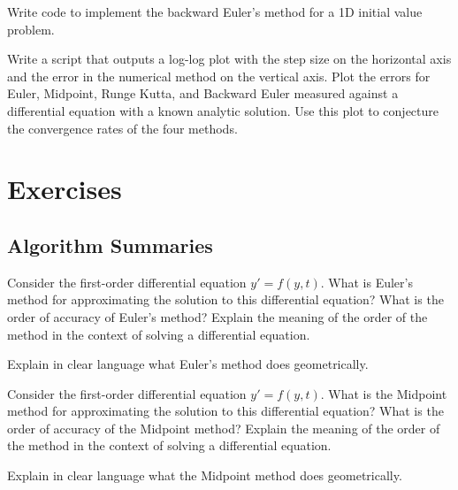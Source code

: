 \begin{problem}
    Write \ProgLang code to implement the backward Euler's method for a 1D initial value
    problem. \\
    \ifnum{}
    \else
    \fi
\end{problem}


\begin{problem}
    Write a \ProgLang script that outputs a log-log plot with the step size on the horizontal
    axis and the error in the numerical method on the vertical axis.  Plot the errors for
    Euler, Midpoint, Runge Kutta, and Backward Euler measured against a differential
    equation with a known analytic solution.  Use this plot to conjecture the convergence
    rates of the four methods.
\end{problem}



\newpage\section{Exercises}

\subsection{Algorithm Summaries}

\begin{problem}
    Consider the first-order differential equation $y' = f(y,t)$.  What is Euler's method
    for approximating the solution to this differential equation?  What is the order of
    accuracy of Euler's method?  Explain the meaning of the order of the method in the
    context of solving a differential equation.
\end{problem}

\begin{problem}
    Explain in clear language what Euler's method does geometrically.
\end{problem}

\begin{problem}
    Consider the first-order differential equation $y' = f(y,t)$.  What is the Midpoint method
    for approximating the solution to this differential equation?  What is the order of
    accuracy of the Midpoint method?  Explain the meaning of the order of the method in the
    context of solving a differential equation.
\end{problem}
\begin{problem}
    Explain in clear language what the Midpoint method does geometrically.
\end{problem}

